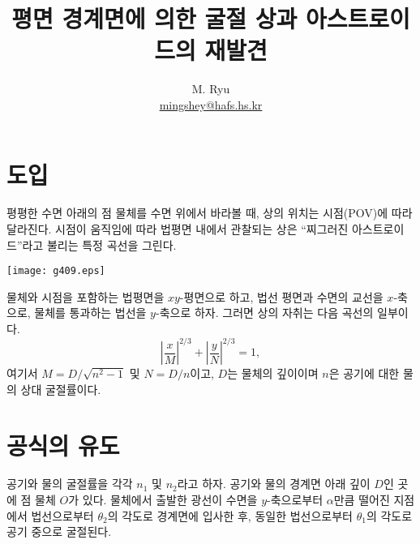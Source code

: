 \documentclass[twocolumn]{article}
\title{평면 경계면에 의한 굴절 상과 아스트로이드의 재발견}
\author{M. Ryu \\ {\href{mailto:mingshey@hafs.hs.kr}{mingshey@hafs.hs.kr}}}
\begin{document}
	\maketitle
	\section{도입}
	평평한 수면 아래의 점 물체를 수면 위에서 바라볼 때, 상의 위치는 시점(POV)에 따라 달라진다. 
	시점이 움직임에 따라 법평면 내에서 관찰되는 상은 ``찌그러진 아스트로이드''라고 불리는 특정 곡선을 그린다.
	
	\texttt{[image: g409.eps]}
	
	물체와 시점을 포함하는 법평면을 $xy$-평면으로 하고, 법선 평면과 수면의 교선을 $x$-축으로, 
	물체를 통과하는 법선을 $y$-축으로 하자. 그러면 상의 자취는 다음 곡선의 일부이다.
	$$ \left| \dfrac{x}{M} \right| ^ {2/3} 
	+ \left| \dfrac{y}{N} \right| ^ {2/3} = 1,$$
	여기서 $M = D/\sqrt{n^2 - 1}$ 및 $N = D/n$이고, $D$는 물체의 깊이이며 $n$은 공기에 대한 물의 상대 굴절률이다.
	
	\section{공식의 유도}
	
	공기와 물의 굴절률을 각각 $n_1$ 및 $n_2$라고 하자. 공기와 물의 경계면 아래 깊이 $D$인 곳에 점 물체 $O$가 있다. 
	물체에서 출발한 광선이 수면을 $y$-축으로부터 $\alpha$만큼 떨어진 지점에서 
	법선으로부터 $\theta_2$의 각도로 경계면에 입사한 후, 동일한 법선으로부터 $\theta_1$의 각도로 공기 중으로 굴절된다.
	
\end{document}
